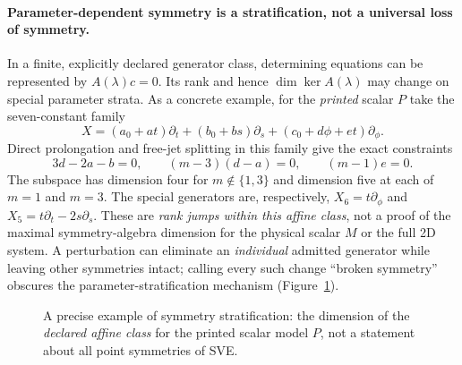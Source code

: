 \documentclass[12pt,a4paper,oneside]{report}
\numberwithin{equation}{chapter}
\theoremstyle{remark}\newtheorem{remark}[theorem]{Remark}
\begin{document}
\paragraph{Parameter-dependent symmetry is a stratification, not a universal
loss of symmetry.}
In a finite, explicitly declared generator class, determining equations
can be represented by $A(\lambda)c=0$. Its rank and hence
$\dim\ker A(\lambda)$ may change on special parameter strata. As a concrete
example, for the \emph{printed} scalar $P$ take the seven-constant family
\begin{equation}\label{eq:affine-class}
 X=(a_0+at)\partial_t+(b_0+bs)\partial_s
       +(c_0+d\phi+et)\partial_\phi.
\end{equation}
Direct prolongation and free-jet splitting in this family give the exact
constraints
\begin{equation}\label{eq:affine-strata}
 3d-2a-b=0,\qquad (m-3)(d-a)=0,\qquad (m-1)e=0.
\end{equation}
The subspace has dimension four for $m\notin\{1,3\}$ and dimension five
at each of $m=1$ and $m=3$. The special generators are, respectively,
$X_6=t\partial_\phi$ and $X_5=t\partial_t-2s\partial_s$. These are
\emph{rank jumps within this affine class}, not a proof of the maximal
symmetry-algebra dimension for the physical scalar $M$ or the full 2D
system. A perturbation can eliminate an \emph{individual} admitted generator
while leaving other symmetries intact; calling every such change
``broken symmetry'' obscures the parameter-stratification mechanism
(Figure~\ref{fig:symmetry-strata}).

\begin{figure}[htbp]\centering
{}
\caption[Restricted symmetry dimension across parameter strata]{A precise example of symmetry stratification: the dimension of the
\emph{declared affine class} for the printed scalar model $P$, not a
statement about all point symmetries of SVE.}
\label{fig:symmetry-strata}
\end{figure}
\end{document}
